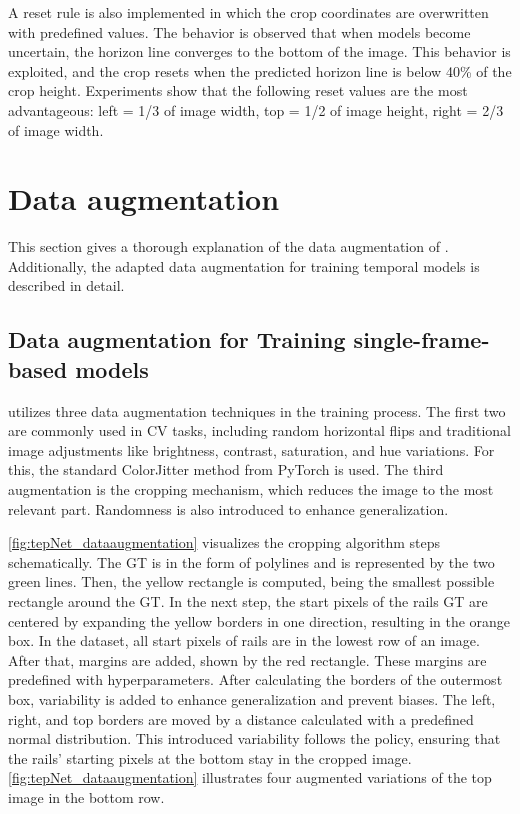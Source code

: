 A reset rule is also implemented in which the crop coordinates are overwritten with predefined values.
The behavior is observed that when models become uncertain, the horizon line converges to the bottom of the image.
This behavior is exploited, and the crop resets when the predicted horizon line is below 40\% of the crop height.
Experiments show that the following reset values are the most advantageous: left = 1/3 of image width, top = 1/2 of image height, right = 2/3 of image width.

\clearpage

\section{Data augmentation}
\label{sec:dataaugmentation}

This section gives a thorough explanation of the data augmentation of \cite{tepNet2024}.
Additionally, the adapted data augmentation for training temporal models is described in detail.

\subsection{Data augmentation for Training single-frame-based models}

\cite{tepNet2024} utilizes three data augmentation techniques in the training process.
The first two are commonly used in \ac{CV} tasks, including random horizontal flips and traditional image adjustments like brightness, contrast, saturation, and hue variations.
For this, the standard ColorJitter \cite{pytorch_colorJitter_docu} method from PyTorch is used.
The third augmentation is the cropping mechanism, which reduces the image to the most relevant part.
Randomness is also introduced to enhance generalization.

\autoref{fig:tepNet_dataaugmentation} visualizes the cropping algorithm steps schematically.
The \ac{GT} is in the form of polylines and is represented by the two green lines.
Then, the yellow rectangle is computed, being the smallest possible rectangle around the \ac{GT}.
In the next step, the start pixels of the rails \ac{GT} are centered by expanding the yellow borders in one direction, resulting in the orange box.
In the dataset, all start pixels of rails are in the lowest row of an image.
After that, margins are added, shown by the red rectangle.
These margins are predefined with hyperparameters.
After calculating the borders of the outermost box, variability is added to enhance generalization and prevent biases.
The left, right, and top borders are moved by a distance calculated with a predefined normal distribution.
This introduced variability follows the policy, ensuring that the rails' starting pixels at the bottom stay in the cropped image.
\autoref{fig:tepNet_dataaugmentation} illustrates four augmented variations of the top image in the bottom row.

